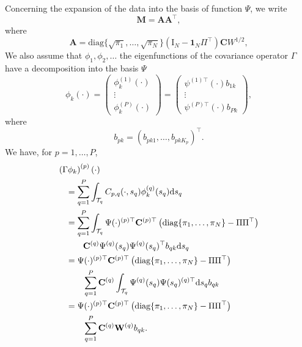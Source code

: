 Concerning the expansion of the data into the basis of function $\Psi$, we write 
\begin{equation}
    \mathbf{M} = \mathbf{A}\mathbf{A}^\top,
\end{equation}
where
\begin{equation}
    \mathbf{A} = \text{diag}\{\sqrt{\pi_1}, \dots, \sqrt{\pi_N}\}\left(\mathrm{I}_{\!N} - \mathbf{1}_{\!N}\Pi^\top\right) \mathbf{C}W^{1/2},
\end{equation}
We also assume that $\phi_1, \phi_2, \dots$ the eigenfunctions of the covariance operator $\Gamma$ have a decomposition into the basis $\Psi$
\begin{equation}
    \phi_k(\cdot) = 
        \begin{pmatrix} 
            \phi_k^{(1)}(\cdot) \\
            \vdots \\
            \phi_k^{(P)}(\cdot)
        \end{pmatrix} = 
        \begin{pmatrix} 
            \psi^{(1) \top}(\cdot) b_{1k} \\
            \vdots \\
            \psi^{(P) \top}(\cdot) b_{Pk}
        \end{pmatrix},
\end{equation}
where
\begin{equation}
    b_{pk} = \left(b_{p k 1}, \dots, b_{p k K_p} \right)^\top.
\end{equation}
We have, for $p = 1, \dots, P$,
\begin{align*}
    \left(\Gamma \phi_k\right)^{(p)}(\cdot) & \\
    &\mkern-72mu = \sum_{q = 1}^P \int_{\TT{q}} C_{p, q}(\cdot, s_q)\phi_k^{(q)}(s_q) \dd s_q \\
    &\mkern-72mu = \sum_{q = 1}^P \int_{\TT{q}} \Psi(\cdot)^{(p) \top} \mathbf{C}^{(p) \top} \left(\text{diag}\{\pi_1, \dots, \pi_N\} - \Pi\Pi^\top\right) \\
    &\mkern-36mu \mathbf{C}^{(q)} \Psi^{(q)}(s_q) \Psi^{(q)}(s_q)^\top b_{q k} \dd s_q \\
    &\mkern-72mu = \Psi(\cdot)^{(p) \top} \mathbf{C}^{(p) \top} \left(\text{diag}\{\pi_1, \dots, \pi_N\} - \Pi\Pi^\top\right) \\
    &\mkern-36mu \sum_{q = 1}^P \mathbf{C}^{(q)} \int_{\TT{q}} \Psi^{(q)}(s_q) \Psi(s_q)^{(q) \top} \dd s_q b_{q k} \\
    &\mkern-72mu = \Psi(\cdot)^{(p) \top} \mathbf{C}^{(p) \top} \left(\text{diag}\{\pi_1, \dots, \pi_N\} - \Pi\Pi^\top\right) \\ 
    &\mkern-36mu \sum_{q = 1}^P \mathbf{C}^{(q)} \mathbf{W}^{(q)} b_{q k}. \\
\end{align*}

